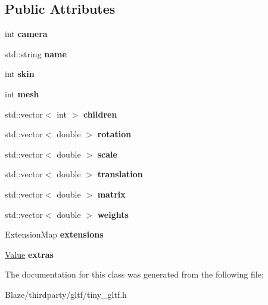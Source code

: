 \subsection*{Public Attributes}
\begin{DoxyCompactItemize}
\item 
\mbox{\label{classtinygltf_1_1Node_a0042bdc3f36e2e38e8c37b8afbb1b54b}} 
int {\bfseries camera}
\item 
\mbox{\label{classtinygltf_1_1Node_ab61c085729c8c7f08071713f453ea403}} 
std\+::string {\bfseries name}
\item 
\mbox{\label{classtinygltf_1_1Node_ad85877ee4def31fd314c7c23bc009521}} 
int {\bfseries skin}
\item 
\mbox{\label{classtinygltf_1_1Node_a1a7df8a710bf4e512f06934c7101a072}} 
int {\bfseries mesh}
\item 
\mbox{\label{classtinygltf_1_1Node_a9db152d7f23e7262021d547ad5716274}} 
std\+::vector$<$ int $>$ {\bfseries children}
\item 
\mbox{\label{classtinygltf_1_1Node_a5c5d2ae614553dfa9d7d1c34ecf1b0e4}} 
std\+::vector$<$ double $>$ {\bfseries rotation}
\item 
\mbox{\label{classtinygltf_1_1Node_ac38e09cd0340ef91bebe0c82869a724e}} 
std\+::vector$<$ double $>$ {\bfseries scale}
\item 
\mbox{\label{classtinygltf_1_1Node_af423045e6e5b43944834e59d04fc3076}} 
std\+::vector$<$ double $>$ {\bfseries translation}
\item 
\mbox{\label{classtinygltf_1_1Node_a3cc32f0984b2660a16ea6a32f6c3f2a5}} 
std\+::vector$<$ double $>$ {\bfseries matrix}
\item 
\mbox{\label{classtinygltf_1_1Node_a8615cd844c629fd6677448643a71d71a}} 
std\+::vector$<$ double $>$ {\bfseries weights}
\item 
\mbox{\label{classtinygltf_1_1Node_adc6160525ec1207c643eccb52bb0efa2}} 
Extension\+Map {\bfseries extensions}
\item 
\mbox{\label{classtinygltf_1_1Node_a6d1bcee2e5fffb07a8a1b9711d8d6f10}} 
\hyperlink{classtinygltf_1_1Value}{Value} {\bfseries extras}
\end{DoxyCompactItemize}


The documentation for this class was generated from the following file\+:\begin{DoxyCompactItemize}
\item 
Blaze/thirdparty/gltf/tiny\+\_\+gltf.\+h\end{DoxyCompactItemize}
